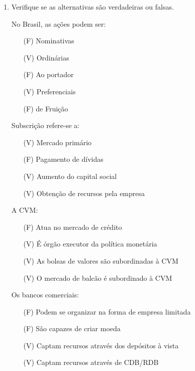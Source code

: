 \documentclass{article}
\begin{document}
\begin{enumerate}
    \item Verifique se as alternativas são verdadeiras ou falsas.

        No Brasil, as ações podem ser:

        \begin{itemize}
            \item[(F)] Nominativas
            \item[(V)] Ordinárias
            \item[(F)] Ao portador
            \item[(V)] Preferenciais
            \item[(F)] de Fruição
        \end{itemize}

        Subscrição refere-se a:

        \begin{itemize}
            \item[(V)] Mercado primário
            \item[(F)] Pagamento de dívidas
            \item[(V)] Aumento do capital social
            \item[(V)] Obtenção de recursos pela empresa
        \end{itemize}

        A CVM:

        \begin{itemize}
            \item[(F)] Atua no mercado de crédito
            \item[(V)] É órgão executor da política monetária
            \item[(V)] As bolsas de valores são subordinadas à CVM
            \item[(V)] O mercado de balcão é subordinado à CVM
        \end{itemize}

        Os bancos comerciais:

        \begin{itemize}
            \item[(F)] Podem se organizar na forma de empresa limitada
            \item[(F)] Sâo capazes de criar moeda
            \item[(V)] Captam recursos através dos depósitos à vista
            \item[(V)] Captam recursos através de CDB/RDB
        \end{itemize}


\end{enumerate}
\end{document}
